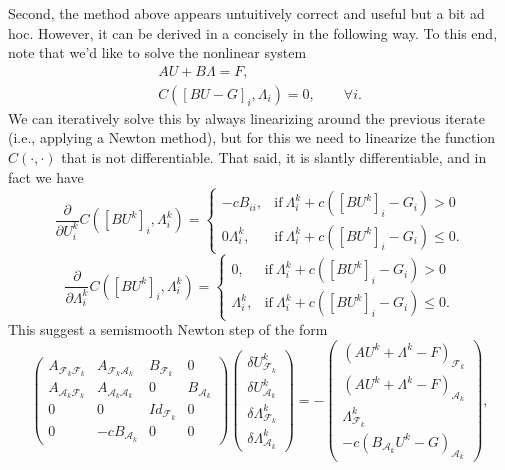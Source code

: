 \documentclass{article}
\begin{document}
Second, the method above appears untuitively correct and useful but a bit ad
hoc. However, it can be derived in a concisely in the following way. To this
end, note that we'd like to solve the nonlinear system
\begin{eqnarray*}
 &A U + B\Lambda = F,&\\
 &C([BU-G]_i, \Lambda_i) = 0,
\qquad \forall i.&
\end{eqnarray*}
We can iteratively solve this by always linearizing around the previous
iterate (i.e., applying a Newton method), but for this we need to linearize
the function $C(\cdot,\cdot)$ that is not differentiable. That said, it is
slantly differentiable, and in fact we have
\begin{equation*}
 \dfrac{\partial}{\partial U^k_i}C([BU^k]_i,\Lambda^k_i) = \begin{cases}
                                   -cB_{ii},& \text{if}\ \Lambda^k_i + c([BU^k]_i - G_i)> 0\\
                                   0\Lambda^k_i,& \text{if}\ \Lambda^k_i + c([BU^k]_i - G_i)\leq 0.
                                  \end{cases}
\end{equation*}
\begin{equation*}
 \dfrac{\partial}{\partial\Lambda^k_i}C([BU^k]_i,\Lambda^k_i) = \begin{cases}
                                   0,& \text{if}\ \Lambda^k_i + c([BU^k]_i - G_i)> 0\\
                                   \Lambda^k_i,& \text{if}\ \Lambda^k_i + c([BU^k]_i - G_i)\leq 0.
                                  \end{cases}
\end{equation*}
This suggest a semismooth Newton step of the form
\begin{equation*}
 \begin{pmatrix}
 A_{\mathcal{F}_k\mathcal{F}_k} & A_{\mathcal{F}_k\mathcal{A}_k} & B_{\mathcal{F}_k} & 0\\
 A_{\mathcal{A}_k\mathcal{F}_k} & A_{\mathcal{A}_k\mathcal{A}_k} & 0 & B_{\mathcal{A}_k}\\
 0 & 0 & Id_{\mathcal{F}_k} & 0\\
 0 & -cB_{\mathcal{A}_k} & 0 & 0
\end{pmatrix}
\begin{pmatrix}
 \delta U^k_{\mathcal{F}_k}\\ \delta U^k_{\mathcal{A}_k}\\ \delta \Lambda^k_{\mathcal{F}_k}\\ \delta \Lambda^k_{\mathcal{A}_k}
\end{pmatrix}
=
-\begin{pmatrix}
 (AU^k + \Lambda^k - F)_{\mathcal{F}_k}\\ (AU^k + \Lambda^k - F)_{\mathcal{A}_k}\\ \Lambda^k_{\mathcal{F}_k}\\ -c(B_{\mathcal{A}_k} U^k - G)_{\mathcal{A}_k}
\end{pmatrix},
\end{equation*}
\end{document}
